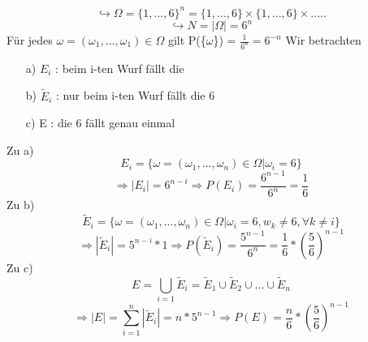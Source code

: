 \documentclass[12pt,a4paper]{article}
\newcommand{\newpara}{\vskip 0.5cm}
\begin{document}
		$$\hookrightarrow \Omega = \{1,...,6\}^n = \{1,...,6\} \times \{1,...,6\} \times .....$$
		$$\hookrightarrow N = |\Omega| = 6^n$$
		Für jedes $\omega = (\omega_{1},...,\omega_{1})\in\Omega$ gilt P(\{$\omega$\}) = $\frac{1}{6^n} =
		6^{-n}$
		Wir betrachten
		\begin{itemize}
			\item[a) ] $E_{i}$ : beim i-ten Wurf fällt die 
			\item[b) ] $\tilde{E}_{i}$ : nur beim i-ten Wurf fällt die 6
			\item[c) ] E : die 6 fällt genau einmal
		\end{itemize}
		Zu a)
		$$E_{i} = \{\omega=(\omega_{1},...,\omega_{n})\in\Omega | \omega_{i} = 6\}$$
		$$\Rightarrow |E_{i}| = 6^{n-i} \Rightarrow P(E_i) = \frac{6^{n-1}}{6^n} = \frac{1}{6}$$
		Zu b)
		$$\tilde{E}_i = \{\omega=(\omega_{1},...,\omega_{n})\in\Omega | \omega_i=6, w_k \neq 6,
		\forall k \neq i\}$$
		$$\Rightarrow |\tilde{E}_i| = 5^{n-i} * 1 \Rightarrow P(\tilde{E}_i) = \frac{5^{n-1}}{6^n} = 
		\frac{1}{6} * \left(\frac{5}{6}\right)^{n-1}$$
		Zu c)
		$$E = \bigcup_{i=1}\tilde{E}_i = \tilde{E}_1 \cup \tilde{E}_2 \cup ... \cup \tilde{E}_n $$
		$$\Rightarrow |E| = \sum_{i=1}^n|\tilde{E}_i| = n*5^{n-1} \Rightarrow P(E) = \frac{n}{6} *
		\left(\frac{5}{6}\right)^{n-1}$$
\newpara
\newpara
\end{document}
